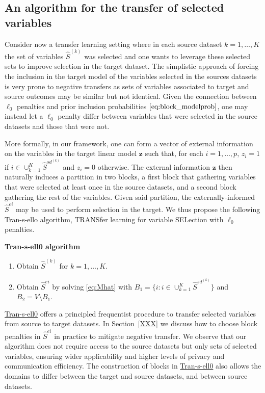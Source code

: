\documentclass[
  12pt]{article}
\newcommand{\bz}{\boldsymbol{z}}
\begin{document}
\subsection{An algorithm for the transfer of selected variables}\label{ssec:intro_tl}

Consider now a transfer learning setting where in each source dataset $k=1,\ldots,K$ the set of variables $\hat{S}^{(k)}$ was selected and one wants to leverage these selected sets to improve selection in the target dataset. The simplistic approach of forcing the inclusion in the target model of the variables selected in the sources datasets is very prone to negative transfers as sets of variables associated to target and source outcomes may be similar but not identical. Given the connection between $\ell_0$ penalties and prior inclusion probabilities $\eqref{eq:block_modelprob}$, one may instead let a $\ell_0$ penalty differ between variables that were selected in the source datasets and those that were not.

More formally, in our framework, one can form a vector of external information on the variables in the target linear model $\bz$ such that, for each $i=1,\ldots,p$, $z_i=1$ if $i\in \cup_{k=1}^K\hat{S}^{sd}^{(k)}$ and $z_i=0$ otherwise. The external information $\bz$ then naturally induces a partition in two blocks, a first block that gathering variables that were selected at least once in the source datasets, and a second block gathering the rest of the variables. Given said partition, the externally-informed $\hat{S}^{ei}$ may be used to perform selection in the target. We thus propose the following Tran-s-ello algorithm, TRANSfer learning for variable SELection with $\ell_0$ penalties.  

\textbf{\hypertarget{lab:AlgoTL}{Tran-s-ell0 algorithm}}
\begin{enumerate}[label=(\roman*)]
    \item Obtain $\hat{S}^{(k)}$ for $k=1,\ldots,K$.
    \item Obtain $\hat{S}^{ei}$ by solving \eqref{eq:Mhat} with $B_1=\{i:i\in \cup_{k=1}^K\hat{S}^{sd}^{(k)}\}$ and $B_2=V\setminus B_1$.
\end{enumerate}

\hyperlink{lab:AlgoTL}{Tran-s-ell0} offers a principled frequentist procedure to transfer selected variables from source to target datasets. In Section~\ref{XXX} we discuss how to choose block penalties in $\hat{S}^{ei}$ in practice to mitigate negative transfer. We observe that our algorithm does not require access to the source datasets but only sets of selected variables, ensuring wider applicability and higher levels of privacy and communication efficiency. The construction of blocks in \hyperlink{lab:AlgoTL}{Tran-s-ell0} also allows the domains to differ between the target and source datasets, and between source datasets.
\end{document}
